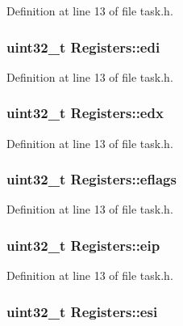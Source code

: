 Definition at line 13 of file task.\+h.

\subsubsection[{\texorpdfstring{edi}{edi}}]{\setlength{\rightskip}{0pt plus 5cm}uint32\+\_\+t Registers\+::edi}\hypertarget{structRegisters_ae94bf35e0b978f6cca838ec6011a1e48}{}\label{structRegisters_ae94bf35e0b978f6cca838ec6011a1e48}


Definition at line 13 of file task.\+h.

\subsubsection[{\texorpdfstring{edx}{edx}}]{\setlength{\rightskip}{0pt plus 5cm}uint32\+\_\+t Registers\+::edx}\hypertarget{structRegisters_a0f90c64246d3bbb917cfe527bf8c34c4}{}\label{structRegisters_a0f90c64246d3bbb917cfe527bf8c34c4}


Definition at line 13 of file task.\+h.

\subsubsection[{\texorpdfstring{eflags}{eflags}}]{\setlength{\rightskip}{0pt plus 5cm}uint32\+\_\+t Registers\+::eflags}\hypertarget{structRegisters_a5216970c0d34ab4b53881f583839c8f9}{}\label{structRegisters_a5216970c0d34ab4b53881f583839c8f9}


Definition at line 13 of file task.\+h.

\subsubsection[{\texorpdfstring{eip}{eip}}]{\setlength{\rightskip}{0pt plus 5cm}uint32\+\_\+t Registers\+::eip}\hypertarget{structRegisters_ad5110c091e713dabd23f23a62d026c07}{}\label{structRegisters_ad5110c091e713dabd23f23a62d026c07}


Definition at line 13 of file task.\+h.

\subsubsection[{\texorpdfstring{esi}{esi}}]{\setlength{\rightskip}{0pt plus 5cm}uint32\+\_\+t Registers\+::esi}\hypertarget{structRegisters_a8f9b382cca633127cb869add3aed7a41}{}\label{structRegisters_a8f9b382cca633127cb869add3aed7a41}


